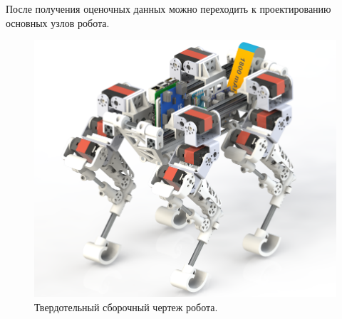 После получения оценочных данных можно переходить к проектированию основных узлов робота.

\begin{figure}[h]
    \centering
    \includegraphics[width=\textwidth]{chapter_mechanics_construction/figure20.png}
    \caption{Твердотельный сборочный чертеж робота.}
    \label{}
\end{figure}